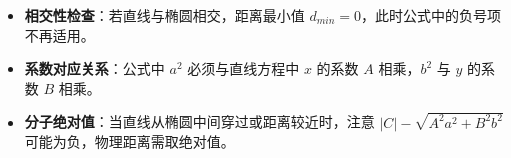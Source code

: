 \begin{trapbox}
\begin{itemize}
    \item \textbf{相交性检查}：若直线与椭圆相交，距离最小值 $d_{min} = 0$，此时公式中的负号项不再适用。
    \item \textbf{系数对应关系}：公式中 $a^2$ 必须与直线方程中 $x$ 的系数 $A$ 相乘，$b^2$ 与 $y$ 的系数 $B$ 相乘。
    \item \textbf{分子绝对值}：当直线从椭圆中间穿过或距离较近时，注意 $|C| - \sqrt{A^2a^2 + B^2b^2}$ 可能为负，物理距离需取绝对值。
\end{itemize}
\end{trapbox}
